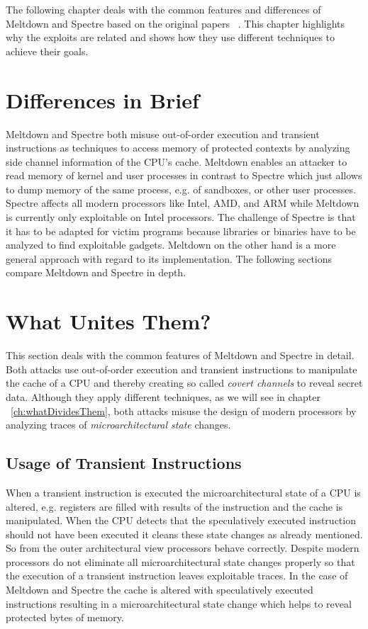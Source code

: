 \documentclass[a4paper,oneside,openright] {scrreprt}
\begin{document}
The following chapter deals with the common features and differences of Meltdown and Spectre based on the
 original papers ~\cite{lipp2018meltdown, kocher2018spectre}. This chapter highlights why the exploits are related
 and shows how they use different techniques to achieve their goals.
 
 
 \section{Differences in Brief}
 \label{ch:intro:motivation}
 
Meltdown and Spectre both misuse out-of-order execution and transient instructions as techniques to access memory of 
protected contexts by analyzing side channel information of the CPU's cache. 
Meltdown enables an attacker to read memory of kernel and user processes
in contrast to Spectre which just allows to dump memory of the same process, e.g. of sandboxes, or other user processes. 
Spectre affects all modern processors like Intel, AMD, and ARM while Meltdown
is currently only exploitable on Intel processors. 
The challenge of Spectre is that it has to be adapted for victim programs
because libraries or binaries have to be analyzed to find exploitable gadgets. 
Meltdown on the other hand is a more general approach with regard to its implementation. The following sections compare Meltdown and Spectre in depth.
 
\section{What Unites Them?}
\label{ch:intro:motivation}

This section deals with the common features of Meltdown and Spectre in detail. 
Both attacks use out-of-order execution and transient instructions to manipulate the cache of a CPU and thereby
creating so called \textit{covert channels} to reveal secret data. Although they apply different techniques, 
as we will see in chapter ~\ref{ch:whatDividesThem}, both attacks misuse the design of modern processors
by analyzing traces of \textit{microarchitectural state} changes. 

\subsection{Usage of Transient Instructions}
\label{ch:intro:motivation:A}

When a transient instruction is executed the microarchitectural state of a CPU is altered, e.g. registers are filled with results
of the instruction and the cache is manipulated. When the CPU detects that the speculatively executed instruction should not have been executed it cleans these state
changes as already mentioned. So from the outer architectural view processors behave correctly. 
Despite modern processors do not eliminate all microarchitectural state changes properly so that the execution of a transient instruction
 leaves exploitable traces. In the case of Meltdown and Spectre the cache is altered with speculatively executed instructions resulting
 in a microarchitectural state change which helps to reveal protected bytes of memory.
\end{document}
